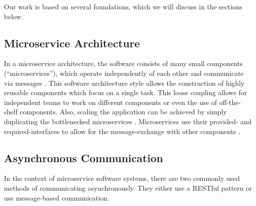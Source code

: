 Our work is based on several foundations, which we will discuss in the sections below.

\subsection{Microservice Architecture}
\label{sec:Foundation:MicroserviceArchitecture}
In a microservice architecture, the software consists of many small components (``microservices''), which operate independently of each other and communicate via messages \cite{Dragoni2017}.
This software architecture style allows the construction of highly reusable components which focus on a single task.
This loose coupling allows for independent teams to work on different components or even the use of off-the-shelf components.
Also, scaling the application can be achieved by simply duplicating the bottlenecked microservices \cite{Dragoni2017}.
Microservices use their provided- and required-interfaces to allow for the message-exchange with other components \cite{Singh2021}.

\subsection{Asynchronous Communication}
\label{sec:Foundation:AsyncCommunication}
In the context of microservice software systems, there are two commonly used methods of communicating asynchronously.
They either use a RESTful pattern or use message-based communication.


